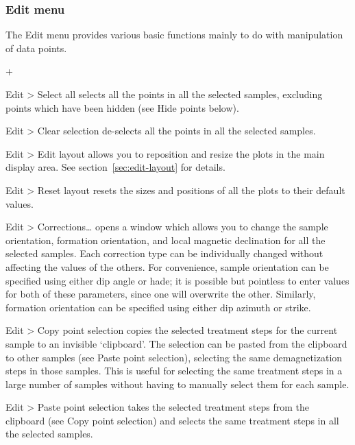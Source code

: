 \documentclass[a4paper,british]{article}
\newcommand{\menuitemlabel}[1]{%
\mbox{\textsf{#1}}\hfil}
\newenvironment{menuitemlist}%
{\begin{list}{}{%
\renewcommand{\makelabel}{\menuitemlabel}%
\setlength{\labelwidth}{35pt}%
\setlength{\leftmargin}%
             {\labelwidth+\labelsep}}}%
{\end{list}}
\newcommand{\ppcmd}[1]{\textsf{#1}} %
\newcommand{\submenu}{ \textgreater{} } %
\begin{document}
\subsubsection{Edit menu}

The \ppcmd{Edit} menu provides various basic functions mainly
to do with manipulation of data points.

\begin{menuitemlist}

\item[Edit\submenu Select all] selects all the points in all the selected
  samples, excluding points which have been hidden (see \ppcmd{Hide points}
  below).

\item[Edit\submenu Clear selection] de-selects all the points in all the
  selected samples.

\item[Edit\submenu Edit layout] allows you to reposition and resize the plots
  in the main display area. See section~\ref{sec:edit-layout} for details.

\item[Edit\submenu Reset layout] resets the sizes and positions of all the
  plots to their default values.

\item[Edit\submenu Corrections\ldots] opens a window which allows you to
  change the sample orientation, formation orientation, and local magnetic
  declination for all the selected samples. Each correction type can be
  individually changed without affecting the values of the others. For
  convenience, sample orientation can be specified using either dip angle or
  hade; it is possible but pointless to enter values for both of these
  parameters, since one will overwrite the other. Similarly, formation
  orientation can be specified using either dip azimuth or strike.

\item[Edit\submenu Copy point selection] copies the selected treatment steps
  for the current sample to an invisible `clipboard'. The selection can be
  pasted from the clipboard to other samples (see \ppcmd{Paste point
    selection}), selecting the same demagnetization steps in those samples.
  This is useful for selecting the same treatment steps in a large number of
  samples without having to manually select them for each sample.

\item[Edit\submenu Paste point selection] takes the selected treatment steps
  from the clipboard (see \ppcmd{Copy point selection}) and selects the same
  treatment steps in all the selected samples.


\end{menuitemlist}
\end{document}
